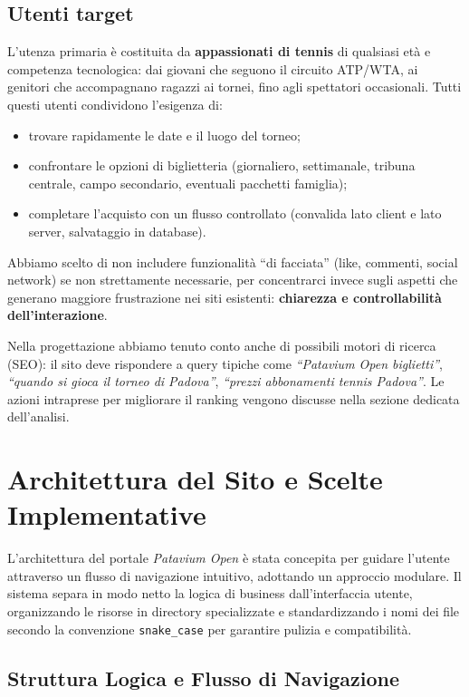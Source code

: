 \documentclass[11pt,a4paper]{article}
\begin{document}
\subsection{Utenti target}
L’utenza primaria è costituita da \textbf{appassionati di tennis} di qualsiasi età e competenza tecnologica: dai giovani che seguono il circuito ATP/WTA, ai genitori che accompagnano ragazzi ai tornei, fino agli spettatori occasionali. Tutti questi utenti condividono l’esigenza di:
\begin{itemize}
    \item trovare rapidamente le date e il luogo del torneo;
    \item confrontare le opzioni di biglietteria (giornaliero, settimanale, tribuna centrale, campo secondario, eventuali pacchetti famiglia);
    \item completare l’acquisto con un flusso controllato (convalida lato client e lato server, salvataggio in database).
\end{itemize}
Abbiamo scelto di non includere funzionalità “di facciata” (like, commenti, social network) se non strettamente necessarie, per concentrarci invece sugli aspetti che generano maggiore frustrazione nei siti esistenti: \textbf{chiarezza e controllabilità dell’interazione}.

Nella progettazione abbiamo tenuto conto anche di possibili motori di ricerca (SEO): il sito deve rispondere a query tipiche come \textit{“Patavium Open biglietti”}, \textit{“quando si gioca il torneo di Padova”}, \textit{“prezzi abbonamenti tennis Padova”}. Le azioni intraprese per migliorare il ranking vengono discusse nella sezione dedicata dell’analisi.

\section{Architettura del Sito e Scelte Implementative}

L'architettura del portale \textit{Patavium Open} è stata concepita per guidare l'utente attraverso un flusso di navigazione intuitivo, adottando un approccio modulare. Il sistema separa in modo netto la logica di business dall'interfaccia utente, organizzando le risorse in directory specializzate e standardizzando i nomi dei file secondo la convenzione \texttt{snake\_case} per garantire pulizia e compatibilità.

\subsection{Struttura Logica e Flusso di Navigazione}
\end{document}

